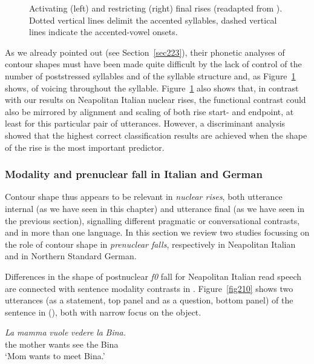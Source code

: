 \begin{figure}
\centering
{}
\caption{Activating (left) and restricting (right) final rises (readapted from \citealt[Figure~1]{dombrowski2005acoustic}). Dotted vertical lines delimit the accented syllables, dashed vertical lines indicate the accented-vowel onsets.}
\label{fig209}\end{figure}

\newpage 

As we already pointed out (see Section~\ref{sec223}), their phonetic analyses of contour shapes must have been made quite difficult by the lack of control of the number of poststressed syllables and of the syllable structure and, as Figure~\ref{fig209} shows, of voicing throughout the syllable. Figure~\ref{fig209} also shows that, in contrast with our results on Neapolitan Italian nuclear rises, the functional contrast could also be mirrored by alignment and scaling of both rise start- and endpoint, at least for this particular pair of utterances. However, a discriminant analysis showed that the highest correct classification results are achieved when the shape of the rise is the most important predictor.

\subsubsection{Modality and prenuclear fall in Italian and German}\label{sec2412}
Contour shape thus appears to be relevant in \textit{nuclear rises}, both utterance internal (as we have seen in this chapter) and utterance final (as we have seen in the previous section), signalling different pragmatic or conversational contrasts, and in more than one language. In this section we review two studies focussing on the role of contour shape in \textit{prenuclear falls}, respectively in Neapolitan Italian and in Northern Standard German.

Differences in the shape of postnuclear \textit{f0} fall for Neapolitan Italian read speech are connected with sentence modality contrasts in \citet{petrone2008tonal}. Figure~\ref{fig210} shows two utterances (as a statement, top panel and as a question, bottom panel) of the sentence in (), both with narrow focus on the object. 

\ea
\gll \textit{La} \textit{mamma} \textit{vuole} \textit{vedere} \textit{la} \textit{Bina.}\\
the mother wants see the Bina\\
\glt ‘Mom wants to meet Bina.’
\z

